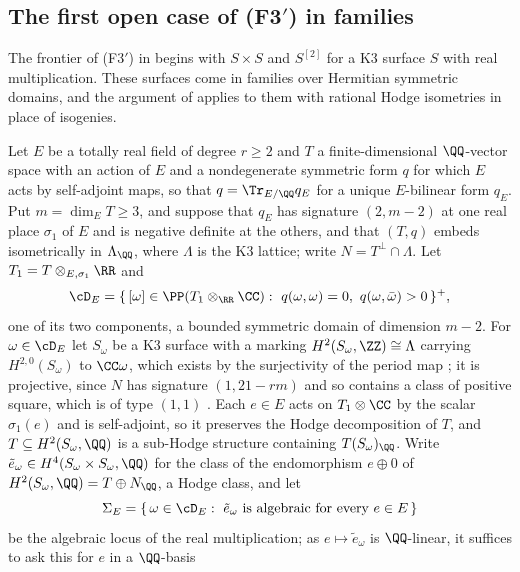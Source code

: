 \subsection{The first open case of (F3$'$) in families}\label{ssec:rmlocus}

The frontier of \textup{(F3$'$)} in  begins with
$S\times S$ and $S^{[2]}$ for a K3 surface $S$ with real multiplication. These
surfaces come in families over Hermitian symmetric domains, and the argument
of \cite[Theorem~1.1]{paperI} applies to them with rational Hodge isometries in place of
isogenies.

\begin{setupenv}\label{setup:rm}
\enlargethispage{2pt}%
Let $E$ be a totally real field of degree $r\ge2$ and $T$ a finite-dimensional
$\QQ$-vector space with an action of $E$ and a nondegenerate symmetric form
$q$ for which $E$ acts by self-adjoint maps, so that $q=\Tr_{E/\QQ}q_{E}$ for
a unique $E$-bilinear form $q_{E}$. Put $m=\dim_{E}T\ge3$, and suppose that
$q_{E}$ has signature $(2,m-2)$ at one real place $\sigma_{1}$ of $E$ and is
negative definite at the others, and that $(T,q)$ embeds isometrically in
$\Lambda_{\QQ}$, where $\Lambda$ is the K3 lattice; write
$N=T^{\perp}\cap\Lambda$. Let $T_{1}=T\otimes_{E,\sigma_{1}}\RR$ and
\[
  \cD_{E}=\{\,[\omega]\in\PP(T_{1}\otimes_{\RR}\CC):\ q(\omega,\omega)=0,\
  q(\omega,\bar\omega)>0\,\}^{+},
\]
one of its two components, a bounded symmetric domain of dimension $m-2$. For
$\omega\in\cD_{E}$ let $S_{\omega}$ be a K3 surface with a marking
$H^{2}(S_{\omega},\ZZ)\cong\Lambda$ carrying $H^{2,0}(S_{\omega})$ to
$\CC\omega$, which exists by the surjectivity of the period map
\cite[Chs.~6--7]{Huy16}; it is projective, since $N$ has signature
$(1,21-rm)$ and so contains a class of positive square, which is of type
$(1,1)$ \cite[Ch.~8]{Huy16}. Each $e\in E$ acts on
$T_{1}\otimes\CC$ by the scalar $\sigma_{1}(e)$ and is self-adjoint, so it
preserves the Hodge decomposition of $T$, and $T\subseteq H^{2}(S_{\omega},\QQ)$
is a sub-Hodge structure containing $T(S_{\omega})_{\QQ}$. Write
$\tilde e_{\omega}\in H^{4}(S_{\omega}\times S_{\omega},\QQ)$ for the class of
the endomorphism $e\oplus0$ of $H^{2}(S_{\omega},\QQ)=T\oplus N_{\QQ}$, a
Hodge class, and let
\[
  \Sigma_{E}=\{\,\omega\in\cD_{E}:\ \tilde e_{\omega}\ \text{is algebraic
  for every}\ e\in E\,\}
\]
be the algebraic locus of the real multiplication; as $e\mapsto\tilde
e_{\omega}$ is $\QQ$-linear, it suffices to ask this for $e$ in a $\QQ$-basis

\end{setupenv}
